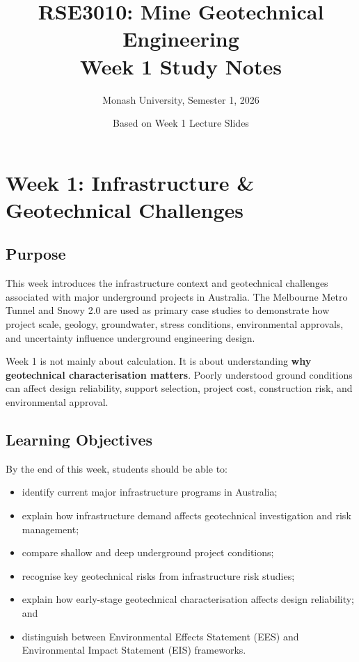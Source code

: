\documentclass[a4paper,12pt]{article}
\title{\textbf{RSE3010: Mine Geotechnical Engineering}\\Week 1 Study Notes}
\author{Monash University, Semester 1, 2026}
\date{Based on Week 1 Lecture Slides}
\begin{document}
\maketitle

\section{Week 1: Infrastructure \& Geotechnical Challenges}

\subsection{Purpose}
This week introduces the infrastructure context and geotechnical challenges associated with major underground projects in Australia. The Melbourne Metro Tunnel and Snowy 2.0 are used as primary case studies to demonstrate how project scale, geology, groundwater, stress conditions, environmental approvals, and uncertainty influence underground engineering design.

\begin{keybox}
Week 1 is not mainly about calculation. It is about understanding \textbf{why geotechnical characterisation matters}. Poorly understood ground conditions can affect design reliability, support selection, project cost, construction risk, and environmental approval.
\end{keybox}

\subsection{Learning Objectives}
By the end of this week, students should be able to:
\begin{itemize}
    \item identify current major infrastructure programs in Australia;
    \item explain how infrastructure demand affects geotechnical investigation and risk management;
    \item compare shallow and deep underground project conditions;
    \item recognise key geotechnical risks from infrastructure risk studies;
    \item explain how early-stage geotechnical characterisation affects design reliability; and
    \item distinguish between Environmental Effects Statement (EES) and Environmental Impact Statement (EIS) frameworks.
\end{itemize}
\end{document}
